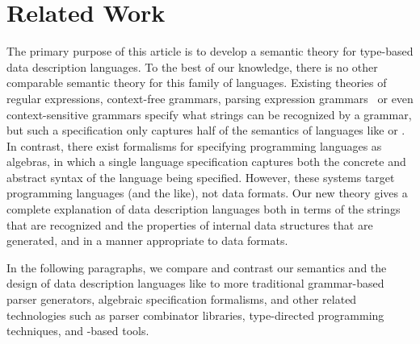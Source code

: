 \section{Related Work}
\label{sec:related}

The primary purpose of this article is to develop a semantic theory
for type-based data description languages.  To the best of our
knowledge, there is no other comparable semantic theory for this
family of languages.  Existing theories of regular expressions,
context-free grammars, parsing expression
grammars~\cite{birman+:parsing,ford:pegs,ford:packrat,grimm:packrat}
or even context-sensitive grammars specify what strings can be
recognized by a grammar, but such a specification only captures half
of the semantics of languages like \pads{} or \packettypes{}.  
In contrast, there exist formalisms for specifying programming
languages as algebras, in which a single language specification
captures both the concrete and abstract syntax of the language being
specified.  However, these systems target programming languages (and
the like), not data formats.  Our new theory gives a complete
explanation of data description languages both in terms of the strings
that are recognized and the properties of internal data structures
that are generated, and in a manner appropriate to data formats.

In the following
paragraphs, we compare and contrast our semantics and the design
of data description languages like \pads{} to more
traditional
grammar-based parser generators, algebraic specification formalisms, and other related technologies
such as parser combinator libraries, 
type-directed programming techniques, and \xml{}-based tools.


